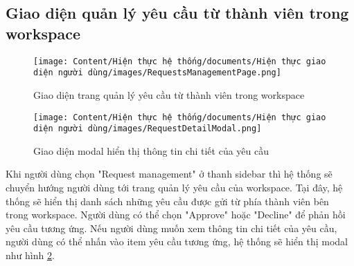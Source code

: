\subsection{Giao diện quản lý yêu cầu từ thành viên trong workspace}

\begin{figure}[H]
    \centering
    \texttt{[image: Content/Hiện thực hệ thống/documents/Hiện thực giao diện người dùng/images/RequestsManagementPage.png]}
    \vspace{0.5cm}
    \caption{Giao diện trang quản lý yêu cầu từ thành viên trong workspace}
    \label{fig: Giao diện trang quản lý yêu cầu từ thành viên trong workspace}
\end{figure}

\begin{figure}[H]
    \centering
    \texttt{[image: Content/Hiện thực hệ thống/documents/Hiện thực giao diện người dùng/images/RequestDetailModal.png]}
    \vspace{0.5cm}
    \caption{Giao diện modal hiển thị thông tin chi tiết của yêu cầu}
    \label{fig: Giao diện modal hiển thị thông tin chi tiết của yêu cầu}
\end{figure}

Khi người dùng chọn "Request management" ở thanh sidebar thì hệ thống sẽ chuyển hướng người dùng tới trang quản lý yêu cầu của workspace. Tại đây, hệ thống sẽ hiển thị danh sách những yêu cầu được gửi từ phía thành viên bên trong workspace. Người dùng có thể chọn "Approve" hoặc "Decline" để phản hồi yêu cầu tương ứng. Nếu người dùng muốn xem thông tin chi tiết của yêu cầu, người dùng có thể nhấn vào item yêu cầu tương ứng, hệ thống sẽ hiển thị modal như hình \ref{fig: Giao diện modal hiển thị thông tin chi tiết của yêu cầu}.